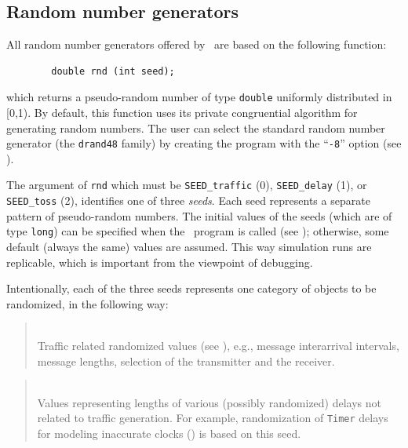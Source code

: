 \subsection{Random number generators}
\label{rm_au_rn}

All random number generators offered by \smurph\ are based on the following
function:
\begin{verbatim}
        double rnd (int seed);
\end{verbatim}
which returns a pseudo-random number of type {\tt double} uniformly
distributed in [0,1).
By default, this function uses its private
congruential algorithm for generating random numbers.
The user can select the standard random number generator (the {\tt drand48}
family) by creating the program with the
``{\tt -8}'' option (see ).

The argument of {\tt rnd} which must be {\tt SEED\_traffic} (0), 
{\tt SEED\_delay} (1), or {\tt SEED\_toss} (2), identifies one of
three {\em seeds}.
Each seed represents a separate pattern of pseudo-random numbers.
The initial values of the seeds (which are of type {\tt long}) can be specified
when the \smurph\ program is called (see ); otherwise,
some default (always the same) values are assumed.
This way simulation runs are replicable, which is important from the
viewpoint of debugging.

Intentionally, each of the three seeds represents one category of objects
to be randomized, in the following way:

\medskip

\begin{quote}
\noindent{}\\ \hspace{0in}
Traffic related randomized values (see ), e.g.,
message interarrival intervals, message lengths,
selection of the transmitter and the receiver.
\end{quote}

\begin{quote}
\noindent{}\\ \hspace{0in}
Values representing lengths of various (possibly randomized)
delays not related to traffic generation.
For example, randomization of {\tt Timer} delays for modeling
inaccurate clocks () is based on this seed.
\end{quote}

